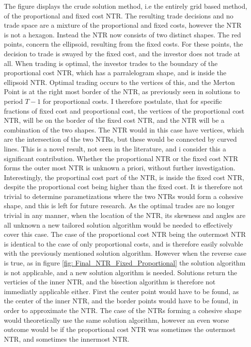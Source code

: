 \documentclass[11pt]{article}
\begin{document}
The figure displays the crude solution method, i.e the entirely grid based method, of the proportional and fixed cost NTR.
The resulting trade decisions and no trade space are a mixture of the proportional and fixed costs, however the NTR is not a hexagon.
Instead the \ac{NTR} now consists of two distinct shapes. The red points, concern the ellipsoid, resulting from the fixed costs.
For these points, the decision to trade is swayed by the fixed cost, and the investor does not trade at all.
When trading is optimal, the investor trades to the boundary of the proportional cost NTR, which has a parralelogram shape, and is inside the ellipsoid NTR.
Optimal trading occurs to the vertices of this, and the Merton Point is at the right most border of the NTR, as previously seen in solutions to period $T-1$ for proportional costs.
I therefore postulate, that for specific fractions of fixed cost and proportional cost, the vertices of the proportional cost NTR,
will be on the border of the fixed cost NTR, and the NTR will be a combination of the two shapes.
The NTR would in this case have vertices, which are the intersection of the two NTRs, but these would be connected by curved lines.
This is a novel result, not seen in the literature, and i consider this a significant contribution.
Whether the proportional NTR or the fixed cost NTR forms the outer most NTR is unknown a priori, without further investigation.
Interestingly, the proportinal cost part of the \ac{NTR}, is inside the fixed cost NTR, despite the proportional cost being higher than the fixed cost.
It is therefore not trivial to determine parametizations where the two NTRs would form a cohesive shape, and this is left for future research.
As the optimal trades are no longer trivial in any manner, when the location of the \ac{NTR}, its skewness and angles are all unknown
a new tailored solution algorithm would be needed to effectively cover this case. The case of the proportional cost NTR being the outermost NTR is identical to the case of only proportional costs,
and is therefore easily solvable with the previously mentioned solution algorithm.
However when the reverse case is true, as in figure \ref{fig: Final_NTR_Fixed_Proportional} the solution algorithm is not applicable, and a new solution algorithm is needed.
Solutions return the verticies of the inner NTR, and the bisection algorithm is therefore not immediatly applicable either.
First the center point would have to be found, as the center of the inner NTR, and the border points would have to be found, in order to approximate the NTR.
The case of the NTRs forming a cohesive shape would theoretically use the same solution algorithm, however an even worse outcome would be if the proportional cost NTR was sometimes the outermost NTR, and sometimes the innermost NTR.
\end{document}
